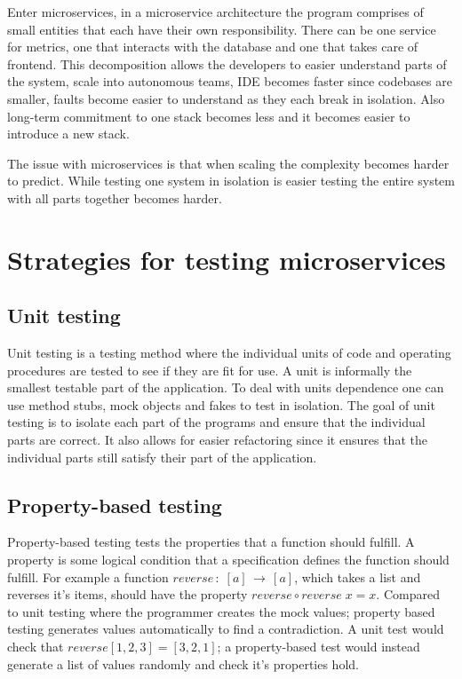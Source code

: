 Enter microservices, in a microservice architecture the program comprises of
small entities that each have their own responsibility. There can be one service
for metrics, one that interacts with the database and one that takes care of
frontend. This decomposition allows the developers to easier understand parts of
the system, scale into autonomous teams, IDE becomes faster since codebases are
smaller, faults become easier to understand as they each break in isolation.
Also long-term commitment to one stack becomes less and it becomes easier to
introduce a new stack. 

The issue with microservices is that when scaling the complexity becomes harder
to predict. While testing one system in isolation is easier testing the entire
system with all parts together becomes harder.

\section{Strategies for testing microservices}

\subsection{Unit testing}

Unit testing is a testing method where the individual units of code and
operating procedures are tested to see if they are fit for use. A unit is
informally the smallest testable part of the application. To deal with units
dependence one can use method stubs, mock objects and fakes to test in
isolation. The goal of unit testing is to isolate each part of the programs and
ensure that the individual parts are correct. It also allows for easier
refactoring since it ensures that the individual parts still satisfy their part
of the application.

\subsection{Property-based testing}

Property-based testing tests the properties that a function should fulfill. A
property is some logical condition that a specification defines the function
should fulfill. For example a function $reverse\, : \; [a]\, \rightarrow\, [a]$,
which takes a list and reverses it's items, should have the property
$reverse\circ reverse\; x = x$. Compared to unit testing where the programmer
creates the mock values; property based testing generates values automatically
to find a contradiction. A unit test would check that $reverse [1,2,3] =
[3,2,1]$; a property-based test would instead generate a list of values
randomly and check it's properties hold.

